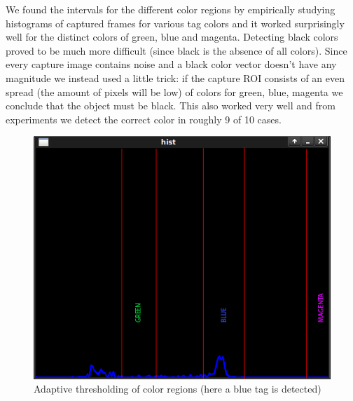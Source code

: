 We found the intervals for the different color regions by empirically studying histograms of captured frames for various tag colors and it worked surprisingly well for the distinct colors of green, blue and magenta. Detecting black colors proved to be much more difficult (since black is the absence of all colors). Since every capture image contains noise and a black color vector doesn't have any magnitude we instead used a little trick: if the capture ROI consists of an even spread (the amount of pixels will be low) of colors for green, blue, magenta we conclude that the object must be black. This also worked very well and from experiments we detect the correct color in roughly 9 of 10 cases.

\begin{figure}[htb!]
\label{fig:histogram}
    \begin{centering}
   	 \includegraphics[scale=0.6]{figures/histogram.png}
   	 \caption{Adaptive thresholding of color regions (here a blue tag is detected)}\label{fig:histogram}
    \end{centering}
\end{figure}
